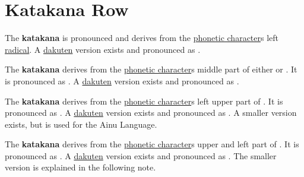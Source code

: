 \section{Katakana  Row}\label{sec:KatakanaKaRow}


\label{letter:ka} The  \textbf{katakana}  is
pronounced  and  derives from the
\hyperref[sec:PhoneticCharacter]{phonetic character}s  left
\hyperref[sec:Radical]{radical}.  A \hyperref[sec:Dakuten]{dakuten} version
exists and pronounced as .



\label{letter:ki} The \textbf{katakana}  derives
from the \hyperref[sec:PhoneticCharacter]{phonetic character}s middle part of
either  or .  It is pronounced as
.  A \hyperref[sec:Dakuten]{dakuten} version exists and pronounced as
.


\label{letter:ku} The \textbf{katakana}  derives
from the \hyperref[sec:PhoneticCharacter]{phonetic character}s left upper part
of .  It is pronounced as .  A
\hyperref[sec:Dakuten]{dakuten} version exists and pronounced as .  A
smaller version exists, but is used for the Ainu Language.

\label{letter:ke} The \textbf{katakana}  derives
from the \hyperref[sec:PhoneticCharacter]{phonetic character}s upper and left
part of .  It is pronounced as .  A
\hyperref[sec:Dakuten]{dakuten} version exists and pronounced as .  The
smaller version  is explained in the following note.

